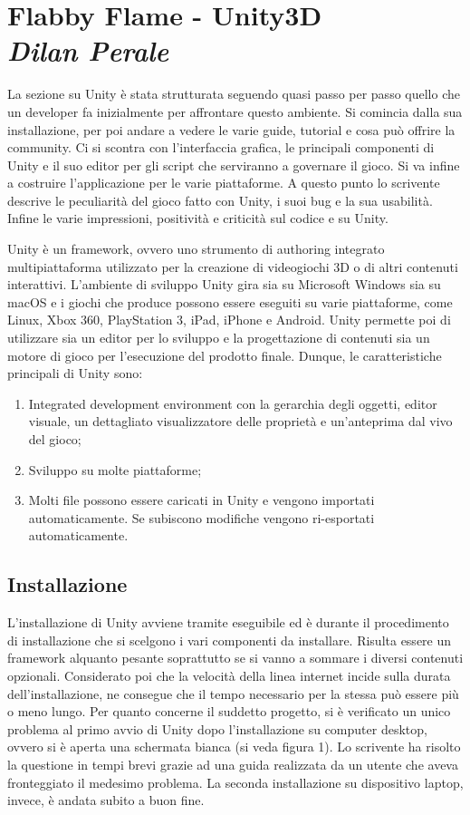 
\newpage
\section{Flabby Flame - Unity3D\\{\small \emph{Dilan Perale}}}
\label{sec:unity}
La sezione su Unity è stata strutturata seguendo quasi passo per passo quello che un developer fa inizialmente per affrontare questo ambiente. Si comincia dalla sua installazione, per poi andare a vedere le varie guide, tutorial e cosa può offrire la community. Ci si scontra con l'interfaccia grafica, le principali componenti di Unity e il suo editor per gli script che serviranno a governare il gioco. Si va infine a costruire l'applicazione per le varie piattaforme. A questo punto lo scrivente descrive le peculiarità del gioco fatto con Unity, i suoi bug e la sua usabilità. Infine le varie impressioni, positività e criticità sul codice e su Unity.


Unity è un framework, ovvero uno strumento di authoring integrato multipiattaforma utilizzato per la creazione di videogiochi 3D o di altri contenuti interattivi. 
L'ambiente di sviluppo Unity gira sia su Microsoft Windows sia su macOS e i giochi che produce possono essere eseguiti su varie piattaforme, come Linux, Xbox 360, PlayStation 3, iPad, iPhone e Android. 
Unity permette poi di utilizzare sia un editor per lo sviluppo e la progettazione di contenuti sia un motore di gioco per l'esecuzione del prodotto finale. 
Dunque, le caratteristiche principali di Unity sono:
\begin{enumerate}
			\item Integrated development environment con la gerarchia degli oggetti, editor visuale, un dettagliato visualizzatore delle proprietà e un'anteprima dal vivo del gioco;
			\item Sviluppo su molte piattaforme;
			\item Molti file possono essere caricati in Unity e vengono importati automaticamente. Se subiscono modifiche vengono ri-esportati automaticamente.
\end{enumerate}

\subsection{Installazione}

L’installazione di Unity avviene tramite eseguibile ed è durante il procedimento di installazione che si scelgono i vari componenti da installare. Risulta essere un framework alquanto pesante soprattutto se si vanno a sommare i diversi contenuti opzionali. Considerato poi che la velocità della linea internet incide sulla durata dell’installazione, ne consegue che il tempo necessario per la stessa può essere più o meno lungo.
Per quanto concerne il suddetto progetto, si è verificato un unico problema al primo avvio di Unity dopo l’installazione su computer desktop, ovvero si è aperta una schermata bianca (si veda figura 1). Lo scrivente ha risolto la questione in tempi brevi grazie ad una guida realizzata da un utente che aveva fronteggiato il medesimo problema. La seconda installazione su dispositivo laptop, invece, è andata subito a buon fine.


